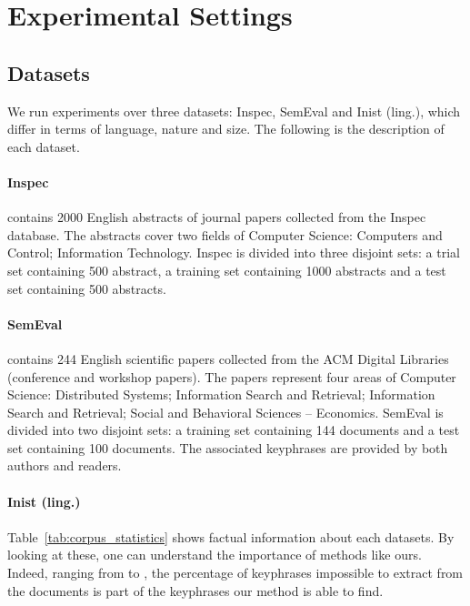 \section{Experimental Settings}
\label{sec:experimental_settings}
  \subsection{Datasets}
  \label{subsec:datasets}
    We run experiments over three datasets: Inspec, SemEval and Inist (ling.),
    which differ in terms of language, nature and size. The following is the
    description of each dataset.

    \paragraph{Inspec~\textnormal{\cite{hulth2003keywordextraction}}} contains
    2000 English abstracts of journal papers collected from the Inspec database.
    The abstracts cover two fields of Computer Science: Computers and Control;
    Information Technology. Inspec is divided into three disjoint sets: a trial
    set containing 500 abstract, a training set containing 1000 abstracts and a
    test set containing 500 abstracts. 

    \paragraph{SemEval~\textnormal{\cite{kim2010semeval}}} contains 244 English
    scientific papers collected from the ACM Digital Libraries (conference and
    workshop papers). The papers represent four areas of Computer Science:
    Distributed Systems; Information Search and Retrieval; Information Search
    and Retrieval; Social and Behavioral Sciences – Economics. SemEval is
    divided into two disjoint sets: a training set containing 144 documents and
    a test set containing 100 documents. The associated keyphrases are provided
    by both authors and readers.

    \paragraph{Inist (ling.)} 

    \paragraph{}
    Table~\ref{tab:corpus_statistics} shows factual information about each
    datasets. By looking at these, one can understand the importance of methods
    like ours. Indeed, ranging from  to , the percentage
    of keyphrases impossible to extract from the documents is part of the
    keyphrases our method is able to find.

